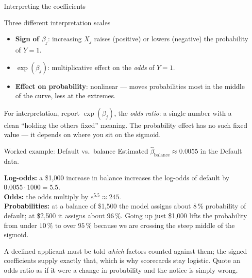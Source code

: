 \documentclass[aspectratio=169,11pt]{beamer}
\begin{document}
\begin{frame}{Interpreting the coefficients}
  \begin{block}{Three different interpretation scales}
    \begin{itemize}
      \item \textbf{Sign of $\beta_j$}: increasing $X_j$ raises (positive)
            or lowers (negative) the probability of $Y = 1$.
      \item \textbf{$\exp(\beta_j)$}: multiplicative effect on the
            \emph{odds} of $Y = 1$.
      \item \textbf{Effect on probability}: nonlinear --- moves
            probabilities most in the middle of the curve, less at the
            extremes.
    \end{itemize}
  \end{block}
  \begin{takeaway}
    For interpretation, report $\exp(\beta_j)$, the \emph{odds ratio}: a
    single number with a clean ``holding the others fixed'' meaning. The
    probability effect has no such fixed value --- it depends on where you
    sit on the sigmoid.
  \end{takeaway}
\end{frame}

\begin{frame}{Worked example: Default vs.\ balance}
  Estimated $\hat\beta_{\text{balance}} \approx 0.0055$ in the Default
  data.
  \begin{numexample}
    \textbf{Log-odds:} a \$1{,}000 increase in balance increases the
    log-odds of default by $0.0055 \cdot 1000 = 5.5$.\\[3pt]
    \textbf{Odds:} the odds multiply by $e^{5.5} \approx 245$.\\[3pt]
    \textbf{Probabilities:} at a balance of \$1{,}500 the model
    assigns about $8\,\%$ probability of default; at \$2{,}500 it
    assigns about $96\,\%$. Going up just \$1{,}000 lifts the
    probability from under $10\,\%$ to over $95\,\%$ because we are
    crossing the steep middle of the sigmoid.
  \end{numexample}
  \begin{industry}
    A declined applicant must be told \emph{which} factors counted against them;
    the signed coefficients supply exactly that, which is why scorecards stay
    logistic. Quote an odds ratio as if it were a change in probability and the
    notice is simply wrong.
  \end{industry}
\end{frame}
\end{document}
